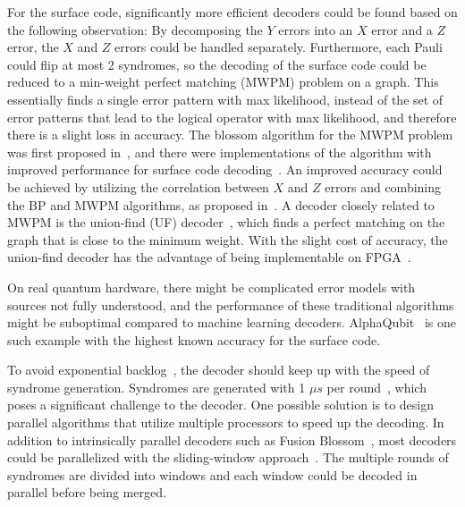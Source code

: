 \documentclass[a4paper,onecolumn,11pt,unpublished]{quantumarticle}
\begin{document}
For the surface code, significantly more efficient decoders could be found based on the following observation: By decomposing the $Y$ errors into an $X$ error and a $Z$ error, the $X$ and $Z$ errors could be handled separately. Furthermore, each Pauli could flip at most 2 syndromes, so the decoding of the surface code could be reduced to a min-weight perfect matching (MWPM) problem on a graph. This essentially finds a single error pattern with max likelihood, instead of the set of error patterns that lead to the logical operator with max likelihood, and therefore there is a slight loss in accuracy. The blossom algorithm for the MWPM problem was first proposed in~\cite{Edmonds1973MatchingET}, and there were implementations of the algorithm with improved performance for surface code decoding~\cite{higgott2022pymatching,wu2023fusion}. An improved accuracy could be achieved by utilizing the correlation between $X$ and $Z$ errors and combining the BP and MWPM algorithms, as proposed in~\cite{higgott2023improved}. A decoder closely related to MWPM is the union-find (UF) decoder~\cite{Delfosse2021almostlineartime}, which finds a perfect matching on the graph that is close to the minimum weight. With the slight cost of accuracy, the union-find decoder has the advantage of being implementable on FPGA~\cite{liyanage2023scalable}.

On real quantum hardware, there might be complicated error models with sources not fully understood, and the performance of these traditional algorithms might be suboptimal compared to machine learning decoders. AlphaQubit~\cite{bausch2024learning} is one such example with the highest known accuracy for the surface code.

To avoid exponential backlog~\cite{Terhal2015QECreview}, the decoder should keep up with the speed of syndrome generation. Syndromes are generated with 1 $\mu s$ per round~\cite{ryananderson2021realization}, which poses a significant challenge to the decoder. One possible solution is to design parallel algorithms that utilize multiple processors to speed up the decoding. In addition to intrinsically parallel decoders such as Fusion Blossom~\cite{wu2023fusion}, most decoders could be parallelized with the sliding-window approach~\cite{tan2023scalable,Skoric2022ParallelWD,bombin2023modular,zhang2025learningneuraldecodingparallelism}. The multiple rounds of syndromes are divided into windows and each window could be decoded in parallel before being merged.
\end{document}
